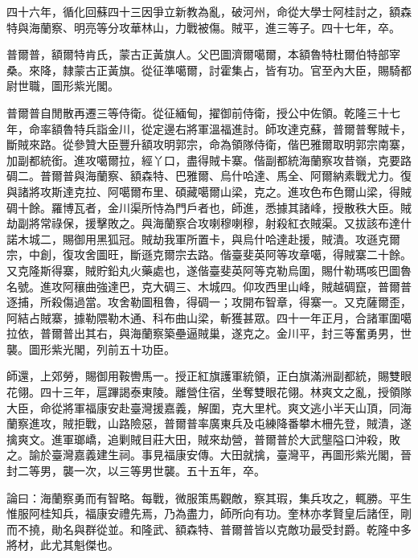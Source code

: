 \begin{pinyinscope}
四十六年，循化回蘇四十三因爭立新教為亂，破河州，命從大學士阿桂討之，額森特與海蘭察、明亮等分攻華林山，力戰被傷。賊平，進三等子。四十七年，卒。

普爾普，額爾特肯氏，蒙古正黃旗人。父巴圖濟爾噶爾，本額魯特杜爾伯特部宰桑。來降，隸蒙古正黃旗。從征準噶爾，討霍集占，皆有功。官至內大臣，賜騎都尉世職，圖形紫光閣。

普爾普自閒散再遷三等侍衛。從征緬甸，擢御前侍衛，授公中佐領。乾隆三十七年，命率額魯特兵詣金川，從定邊右將軍溫福進討。師攻達克蘇，普爾普奪賊卡，斷賊來路。從參贊大臣豐升額攻明郭宗，命為領隊侍衛，偕巴雅爾取明郭宗南寨，加副都統銜。進攻噶爾拉，經丫口，盡得賊卡寨。偕副都統海蘭察攻昔嶺，克要路碉二。普爾普與海蘭察、額森特、巴雅爾、烏什哈達、馬全、阿爾納素戰尤力。復與諸將攻斯達克拉、阿噶爾布里、碩藏噶爾山梁，克之。進攻色布色爾山梁，得賊碉十餘。羅博瓦者，金川渠所恃為門戶者也，師進，悉據其諸峰，授散秩大臣。賊劫副將常祿保，援擊敗之。與海蘭察合攻喇穆喇穆，射殺紅衣賊渠。又拔該布達什諾木城二，賜御用黑狐冠。賊劫我軍所置卡，與烏什哈達赴援，賊潰。攻遜克爾宗，中創，復攻舍圖旺，斷遜克爾宗去路。偕臺斐英阿等攻章噶，得賊寨二十餘。又克隆斯得寨，賊貯鉛丸火藥處也，遂偕臺斐英阿等克勒烏圍，賜什勒瑪咳巴圖魯名號。進攻阿穰曲強達巴，克大碉三、木城四。仰攻西里山峰，賊越碉竄，普爾普逐捕，所殺傷過當。攻舍勒圖租魯，得碉一；攻開布智章，得寨一。又克薩爾歪，阿結占賊寨，據勒隈勒木通、科布曲山梁，斬獲甚眾。四十一年正月，合諸軍圍噶拉依，普爾普出其右，與海蘭察築壘逼賊巢，遂克之。金川平，封三等奮勇男，世襲。圖形紫光閣，列前五十功臣。

師還，上郊勞，賜御用鞍轡馬一。授正紅旗護軍統領，正白旗滿洲副都統，賜雙眼花翎。四十三年，扈蹕謁泰東陵。離營住宿，坐奪雙眼花翎。林爽文之亂，授領隊大臣，命從將軍福康安赴臺灣援嘉義，解圍，克大里杙。爽文逃小半天山頂，同海蘭察進攻，賊拒戰，山路險惡，普爾普率廣東兵及屯練降番攀木柵先登，賊潰，遂擒爽文。進軍瑯嶠，追剿賊目莊大田，賊來劫營，普爾普於大武壟隘口沖殺，敗之。諭於臺灣嘉義建生祠。事見福康安傳。大田就擒，臺灣平，再圖形紫光閣，晉封二等男，襲一次，以三等男世襲。五十五年，卒。

論曰：海蘭察勇而有智略。每戰，微服策馬觀敵，察其瑕，集兵攻之，輒勝。平生惟服阿桂知兵，福康安禮先焉，乃為盡力，師所向有功。奎林亦孝賢皇后諸侄，剛而不撓，勛名與群從並。和隆武、額森特、普爾普皆以克敵功最受封爵。乾隆中多將材，此尤其魁傑也。


\end{pinyinscope}